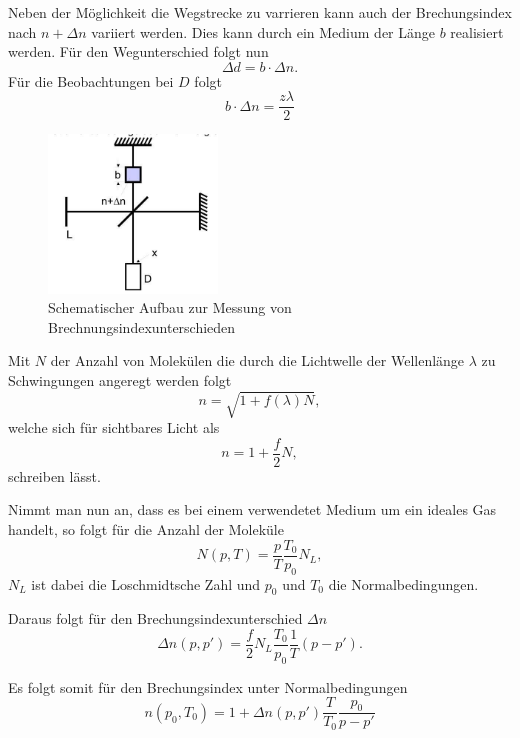 Neben der Möglichkeit die Wegstrecke zu varrieren kann auch der Brechungsindex nach $n+\Delta n$ variiert werden. 
Dies kann durch ein Medium der Länge $b$ realisiert werden.
Für den Wegunterschied folgt nun
\begin{equation}
    \Delta d =b\cdot \Delta n. \nonumber
\end{equation}
Für die Beobachtungen bei $D$ folgt
\begin{equation}
    b\cdot \Delta n = \frac{z\lambda}{2} \label{eqn:Brechungsindexaenderung}
\end{equation}
\begin{figure}[H]
    \centering
    \includegraphics[width=0.4\textwidth]{bilder/n.jpg}
    \caption{Schematischer Aufbau zur Messung von Brechnungsindexunterschieden \cite[5]{anleitung}}
\end{figure}
\label{sec:theorie}
Mit $N$ der Anzahl von Molekülen die durch die Lichtwelle der Wellenlänge $\lambda$
zu Schwingungen angeregt werden folgt
\begin{equation}
    n=\sqrt{1+f(\lambda)N},
\end{equation}
welche sich für sichtbares Licht als
\begin{equation}
    n=1+\frac{f}{2}N,
\end{equation}
schreiben lässt.

Nimmt man nun an, dass es bei einem verwendetet Medium um ein ideales Gas handelt,
so folgt für die Anzahl der Moleküle
\begin{equation}
    N(p,T)=\frac{p}{T}\frac{T_0}{p_0}N_L,
\end{equation}
$N_L$ ist dabei die Loschmidtsche Zahl und $p_0$ und $T_0$ die Normalbedingungen.

Daraus folgt für den Brechungsindexunterschied $\Delta n$
\begin{equation}
    \Delta n(p,p')=\frac{f}{2}N_L \frac{T_0}{p_0}\frac{1}{T}(p-p').
\end{equation}

Es folgt somit für den Brechungsindex unter Normalbedingungen
\begin{equation}
    n(p_0,T_0)=1+\Delta n(p,p')\frac{T}{T_0}\frac{p_0}{p-p'}
    \label{eqn:Brechungsindex}
\end{equation}
